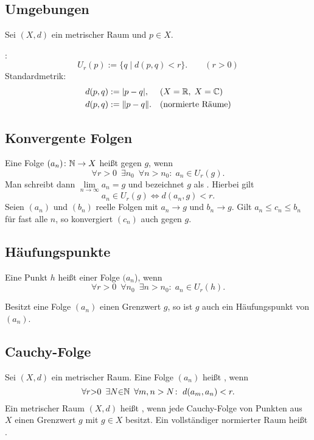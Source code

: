 \subsection{Umgebungen}

Sei $(X,d)$ ein metrischer Raum und $p\in X$.

{}
:
\begin{equation}
U_r(p) := \{q\mid d(p,q)<r\}.\qquad (r>0)
\end{equation}
Standardmetrik:
\begin{align}
d(p,q) &:= |p-q|,\quad\; (\text{$X=\mathbb R$,\;\,$X=\mathbb C$})\\
d(p,q) &:=\|p-q\|.\quad (\text{normierte Räume})
\end{align}

\subsection{Konvergente Folgen}
{}
Eine Folge $(a_n)\colon \mathbb N\to X$ heißt  gegen $g$, wenn%
\begin{equation}\label{eq:konvergent}
\forall r{>}0\enspace\exists n_0\enspace\forall n{>}n_0\colon\;
a_n\in U_r(g).
\end{equation}
Man schreibt dann $\lim\limits_{n\to\infty} a_n=g$ und bezeichnet
$g$ als .
Hierbei gilt
\begin{equation}
a_n\in U_r(g)\iff d(a_n,g)<r.
\end{equation}
 Seien $(a_n)$ und $(b_n)$ reelle Folgen
mit $a_n\to g$ und $b_n\to g$. Gilt $a_n\le c_n\le b_n$ für fast alle
$n$, so konvergiert $(c_n)$ auch gegen $g$.

\subsection{Häufungspunkte}
\begin{Definition}
Eine Punkt $h$ heißt  einer Folge $(a_n$), wenn
\begin{equation}
\forall r{>}0\enspace\forall n_0\enspace\exists n{>}n_0\colon\;
a_n\in U_r(h).
\end{equation}
\end{Definition}
\noindent
Besitzt eine Folge $(a_n)$ einen Grenzwert $g$, so ist $g$ auch ein
Häufungspunkt von $(a_n)$.

\subsection{Cauchy-Folge}
{}
Sei $(X,d)$ ein metrischer Raum.
Eine Folge $(a_n)$ heißt ,
wenn
\begin{equation}
\forall r{>}0\enspace\exists N{\in}\mathbb N\enspace\forall m,n>N\colon\;
d(a_m,a_n)<r.
\end{equation}
\noindent
Ein metrischer Raum $(X,d)$ heißt ,
wenn jede Cauchy-Folge von Punkten aus $X$ einen Grenzwert $g$
mit $g\in X$ besitzt. Ein vollständiger normierter Raum heißt
.

